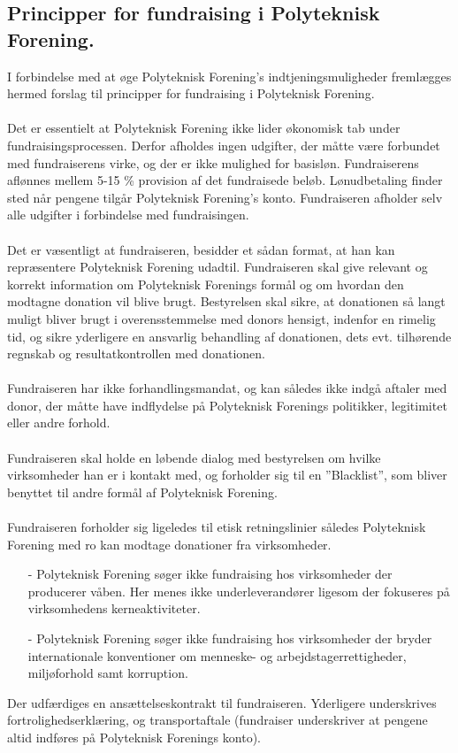 \subsection{Principper for fundraising i Polyteknisk Forening.}
I forbindelse med at øge Polyteknisk Forening’s indtjeningsmuligheder fremlægges hermed forslag til principper for fundraising i Polyteknisk Forening.\\
\\
Det er essentielt at Polyteknisk Forening ikke lider økonomisk tab under fundraisingsprocessen. Derfor afholdes ingen udgifter, der måtte være forbundet med fundraiserens virke, og der er ikke mulighed for basisløn. Fundraiserens aflønnes mellem 5-15 \% provision af det fundraisede beløb. Lønudbetaling finder sted når pengene tilgår Polyteknisk Forening’s konto. Fundraiseren afholder selv alle udgifter i forbindelse med fundraisingen.\\
\\
Det er væsentligt at fundraiseren, besidder et sådan format, at han kan repræsentere Polyteknisk Forening udadtil. Fundraiseren skal give relevant og korrekt information om Polyteknisk Forenings formål og om hvordan den modtagne donation vil blive brugt. Bestyrelsen skal sikre, at donationen så langt muligt bliver brugt i overensstemmelse med donors hensigt, indenfor en rimelig tid, og sikre yderligere en ansvarlig behandling af donationen, dets evt. tilhørende regnskab og resultatkontrollen med donationen.\\
\\
Fundraiseren har ikke forhandlingsmandat, og kan således ikke indgå aftaler med donor, der måtte have indflydelse på Polyteknisk Forenings politikker, legitimitet eller andre forhold.\\
\\
Fundraiseren skal holde en løbende dialog med bestyrelsen om hvilke virksomheder han er i kontakt med, og forholder sig til en ”Blacklist”, som bliver benyttet til andre formål af Polyteknisk Forening.\\
\\
Fundraiseren forholder sig ligeledes til etisk retningslinier således Polyteknisk Forening med ro kan modtage donationer fra virksomheder.
\begin{itemize}
\item[-] Polyteknisk Forening søger ikke fundraising hos virksomheder der producerer våben. Her menes ikke
underleverandører ligesom der fokuseres på virksomhedens kerneaktiviteter.
\item[-] Polyteknisk Forening søger ikke fundraising hos virksomheder der bryder internationale konventioner om
menneske- og arbejdstagerrettigheder, miljøforhold samt korruption.
\end{itemize}

Der udfærdiges en ansættelseskontrakt til fundraiseren. Yderligere underskrives fortrolighedserklæring, og transportaftale (fundraiser underskriver at pengene altid indføres på Polyteknisk Forenings konto).